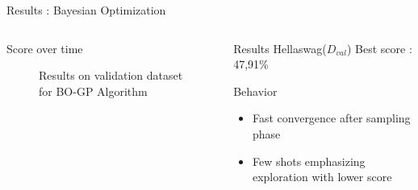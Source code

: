 \begin{frame}{Results : Bayesian Optimization} 
    
    \begin{columns}
    
        \begin{column}{0.6\textwidth}
            \begin{block}{Score over time}
                \begin{figure}
                    \centering
                    
                    \caption{Results on validation dataset for BO-GP Algorithm}
                \end{figure}
            
            \end{block}   
        \end{column}

        \begin{column}{0.4\textwidth}
            \begin{block}{Results}
                Hellaswag($D_{val}$) Best score : 47,91\%        
            \end{block}

            \begin{block}{Behavior}

                \begin{itemize}
                    \item Fast convergence after sampling phase
                    \item Few shots emphasizing exploration with lower score
                \end{itemize}
                
                
            \end{block}
             
        \end{column}
    \end{columns}    
\end{frame}

